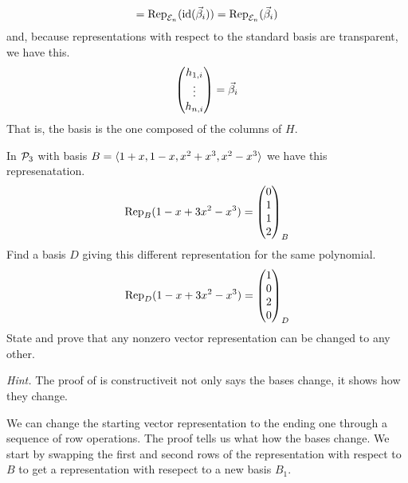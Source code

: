 \begin{exercises}
\begin{answer}
\begin{equation*}
         =\rep{\identity(\vec{\beta}_i)}{\stdbasis_n}
         =\rep{\vec{\beta}_i}{\stdbasis_n}
       \end{equation*}
       and, because representations with respect to the standard basis
       are transparent, we have this.
       \begin{equation*}
         \colvec{h_{1,i} \\ \vdots \\ h_{n,i}}
         =\vec{\beta}_i
       \end{equation*}
       That is, the basis is the one composed of the columns of \( H \).  
    \end{answer}
  \recommended \item \label{exer:AnyNonZeroRepChgTOAnyOther}
    \begin{exparts}
      \partsitem  In \( \polyspace_3 \) with basis
        \( B=\sequence{1+x,1-x,x^2+x^3,x^2-x^3} \) we have this
        represenatation.
        \begin{equation*}
          \rep{1-x+3x^2-x^3}{B}=
            \colvec{0 \\ 1 \\ 1 \\ 2}_B
        \end{equation*}
        Find a basis \( D \) 
        giving this different representation for the same
        polynomial. 
        \begin{equation*}
          \rep{1-x+3x^2-x^3}{D}=
            \colvec{1 \\ 0 \\ 2 \\ 0}_D
        \end{equation*}
      \partsitem State and prove that any nonzero vector
        representation can be changed to any other.
    \end{exparts}
    \noindent\textit{Hint.}
    The proof of 
    is constructive\Dash it not only says the bases change, it shows
    how they change.
    \begin{answer}
      \begin{exparts}
        \partsitem We can change the starting vector representation
          to the ending one through a sequence of row operations.
          The proof tells us what how the bases change. 
          We start by swapping the first and second rows
          of the representation with respect to $B$ to get a representation
          with resepect to a new basis $B_1$.
          \begin{equation*}

\end{equation*}
\end{exparts}
\end{answer}
\end{exercises}
